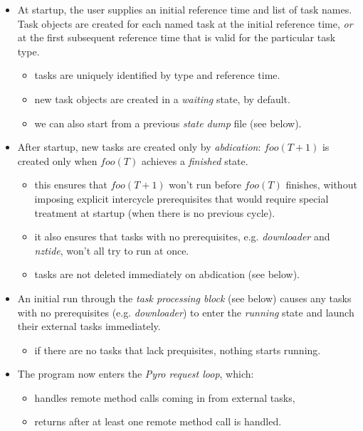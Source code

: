 \documentclass[12pt]{article}
\begin{document}
\begin{itemize}
    \item At startup, the user supplies an initial reference time and
    list of task names. Task objects are created for each named task at
    the initial reference time, {\em or} at the first subsequent
    reference time that is valid for the particular task type.
    \begin{itemize}
        \item tasks are uniquely identified by type and reference time. 
        \item new task objects are created in a {\em waiting} state, by
        default.
        \item we can also start from a previous {\em state dump} file
        (see below).
    \end{itemize}

\item After startup, new tasks are created only by {\em abdication}:
$foo(T+1)$ is created only when $foo(T)$ achieves a {\em finished} state.
    \begin{itemize}
    \item this ensures that $foo(T+1)$ won't run before $foo(T)$
    finishes, without imposing explicit intercycle prerequisites
    that would require special treatment at startup (when there is no
    previous cycle). 
    \item it also ensures that tasks with no prerequisites, e.g.
    {\em downloader} and {\em nztide}, won't all try to run at once.
    \item tasks are not deleted immediately on abdication (see below). 
    \end{itemize}

\item An initial run through the {\em task processing block} (see below)
causes any tasks with no prerequisites (e.g. {\em downloader}) to enter the
{\em running} state and launch their external tasks immediately.
    \begin{itemize}
    \item if there are no tasks that lack prequisites, nothing starts running.
    \end{itemize}

\item The program now enters the {\em Pyro request loop}, which:

    \begin{itemize}
    \item handles remote method calls coming in from external tasks, 
    \item returns after at least one remote method call is handled. 
    \end{itemize}


\end{itemize}
\end{document}
